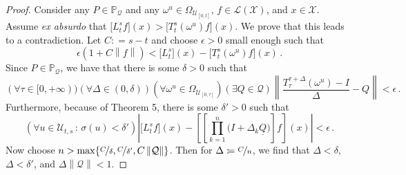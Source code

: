 \documentclass[a4paper,reqno]{amsart}
\newcommand{\states}{\mathcal{X}}
\newcommand{\gambles}{\mathcal{L}}
\newcommand{\gamblesX}{\gambles(\states)}
\newcommand{\lrate}{\underline{Q}}
\newcommand{\norm}[1]{\left\lVert #1 \right\rVert}
\newcommand{\coloneqq}{:\!=}
\begin{document}
\begin{proof}
Consider any $P\in\mathbb{P}_\mathcal{Q}$ and any $\omega^u\in\Omega_{\mathcal{U}_{[0,t]}}$, $f\in\gamblesX$, and $x\in\states$. Assume \emph{ex absurdo} that $\bigl[L_t^sf\bigr](x) > \bigl[T_t^s(\omega^u)f\bigr](x)$. We prove that this leads to a contradiction. Let $C\coloneqq s-t$ and choose $\epsilon>0$ small enough such that
\begin{equation}
\epsilon(1+C\norm{f}) < \bigl[L_t^s\bigr](x) - \bigl[T_t^s(\omega^u)f\bigr](x)\,.
\end{equation}
Since $P\in\mathbb{P}_\mathcal{Q}$, we have that there is some $\delta>0$ such that
\begin{equation}
(\forall \tau\in[0,+\infty))(\forall\Delta\in(0,\delta))(\forall\omega^u\in\Omega_{\mathcal{U}_{[0,\tau]}})(\exists Q\in\mathcal{Q})\norm{\frac{T_\tau^{\tau+\Delta}(\omega^u)-I}{\Delta}-Q}<\epsilon\,.
\end{equation}
Furthermore, because of Theorem 5, there is some $\delta'>0$ such that
\begin{equation}
(\forall u\in\mathcal{U}_{t,s}\,:\,\sigma(u)<\delta')\left\vert \bigl[L_t^sf\bigr](x) - \left[\left[\prod_{k=1}^n\bigl(I+\Delta_k\lrate\bigr)\right]f\right](x)\right\vert < \epsilon\,.
\end{equation}
Now choose $n>\max\{\nicefrac{C}{\delta},\nicefrac{C}{\delta'},C\norm{\mathcal{Q}}\}$. Then for $\Delta\coloneqq\nicefrac{C}{n}$, we find that $\Delta<\delta$, $\Delta<\delta'$, and $\Delta\norm{\mathcal{Q}}<1$.


\end{proof}
\end{document}
